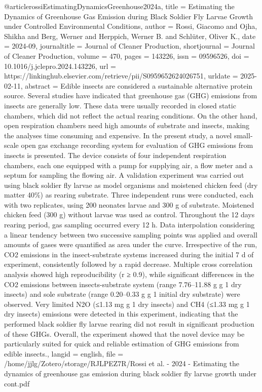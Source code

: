 {{{{@article{rossiEstimatingDynamicsGreenhouse2024a,
  title = {Estimating the Dynamics of Greenhouse Gas Emission during Black Soldier Fly Larvae Growth under Controlled Environmental Conditions},
  author = {Rossi, Giacomo and Ojha, Shikha and Berg, Werner and Herppich, Werner B. and Schlüter, Oliver K.},
  date = {2024-09},
  journaltitle = {Journal of Cleaner Production},
  shortjournal = {Journal of Cleaner Production},
  volume = {470},
  pages = {143226},
  issn = {09596526},
  doi = {10.1016/j.jclepro.2024.143226},
  url = {https://linkinghub.elsevier.com/retrieve/pii/S0959652624026751},
  urldate = {2025-02-11},
  abstract = {Edible insects are considered a sustainable alternative protein source. Several studies have indicated that greenhouse gas (GHG) emissions from insects are generally low. These data were usually recorded in closed static chambers, which did not reflect the actual rearing conditions. On the other hand, open respiration chambers need high amounts of substrate and insects, making the analyses time consuming and expensive. In the present study, a novel small-scale open gas exchange recording system for evaluation of GHG emissions from insects is presented. The device consists of four independent respiration chambers, each one equipped with a pump for supplying air, a flow meter and a septum for sampling the flowing air. A validation experiment was carried out using black soldier fly larvae as model organisms and moistened chicken feed (dry matter 40\%) as rearing substrate. Three independent runs were conducted, each with two replicates, using 200 neonates larvae and 300 g of substrate. Moistened chicken feed (300 g) without larvae was used as control. Throughout the 12 days rearing period, gas sampling occurred every 12 h. Data interpolation considering a linear tendency between two successive sampling points was applied and overall amounts of gases were quantified as area under the curve. Irrespective of the run, CO2 emissions in the insect-substrate systems increased during the initial 7 d of experiment, consistently followed by a rapid decrease. Multiple cross correlation analysis showed high reproducibility (r ≥ 0.9), while significant differences in the CO2 emissions between insects-substrate system (range 7.76–11.88 g g 1 dry insects) and sole substrate (range 0.20–0.33 g g 1 initial dry substrate) were observed. Very limited N2O (≤1.13 mg g 1 dry insects) and CH4 (≤1.33 mg g 1 dry insects) emissions were detected in this experiment, indicating that the performed black soldier fly larvae rearing did not result in significant production of these GHGs. Overall, the experiment showed that the novel device may be particularly suited for quick and reliable estimation of GHG emissions from edible insects.},
  langid = {english},
  file = {/home/jjlg/Zotero/storage/RJLPEZ7R/Rossi et al. - 2024 - Estimating the dynamics of greenhouse gas emission during black soldier fly larvae growth under cont.pdf}
}

}}}}
